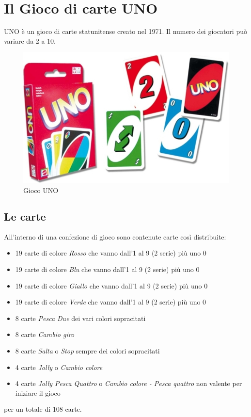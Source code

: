 \section{Il Gioco di carte UNO}
	UNO è un gioco di carte statunitense creato nel 1971. Il numero dei giocatori può variare da 2 a 10. 
	\begin{figure}[h]
		\centering
		\includegraphics[scale=1]{uno.jpg}
		\caption{Gioco UNO}
		\label{fig0}
	\end{figure}
	
		\subsection{Le carte}
			All'interno di una confezione di gioco sono contenute carte così distribuite:
			\begin{itemize}
			\item 19 carte di colore \textit{Rosso} che vanno dall'1 al 9 (2 serie) più uno 0
			\item 19 carte di colore \textit{Blu} che vanno dall'1 al 9 (2 serie) più uno 0
			\item 19 carte di colore \textit{Giallo}  che vanno dall'1 al 9 (2 serie) più uno 0
			\item 19 carte di colore \textit{Verde}  che vanno dall'1 al 9 (2 serie) più uno 0
			\item 8 carte \textit{Pesca Due} dei vari colori sopracitati
			\item 8 carte \textit{Cambio giro} 
			\item 8 carte \textit{Salta} o \textit{Stop} sempre dei colori sopracitati
			\item 4 carte \textit{Jolly} o \textit{Cambio colore}
			\item 4 carte \textit{Jolly Pesca Quattro} o \textit{Cambio colore - Pesca quattro} non valente per iniziare il gioco
			\end{itemize}
			per un totale di 108 carte.
			
